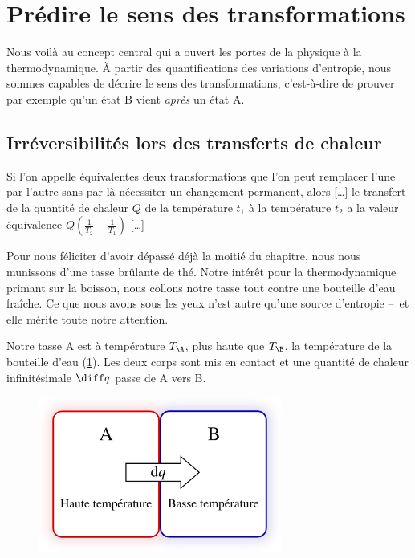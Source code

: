 \section{Prédire le sens des transformations}

	Nous voilà au concept central qui a ouvert les portes de la physique à la thermodynamique. À partir des quantifications des variations d’entropie, nous sommes capables de décrire le sens des transformations, c’est-à-dire de prouver par exemple qu’un état B vient \emph{après} un état A. 

	\subsection{Irréversibilités lors des transferts de chaleur}

			Si l’on appelle équivalentes deux transformations que l’on peut remplacer l’une par l’autre sans par là nécessiter un changement permanent, alors […] le transfert de la quantité de chaleur $Q$ de la température $t_1$ à la température $t_2$ a la valeur équivalence $Q \left( \frac{1}{T_2} - \frac{1}{T_1}\right)$ […]
		
		Pour nous féliciter d’avoir dépassé déjà la moitié du chapitre, nous nous munissons d’une tasse brûlante de thé. Notre intérêt pour la thermodynamique primant sur la boisson, nous collons notre tasse tout contre une bouteille d’eau fraîche. Ce que nous avons sous les yeux n’est autre qu’une source d’entropie --\ et elle mérite toute notre attention.

		Notre tasse A est à température $T_\A$, plus haute que $T_\B$, la température de la bouteille d’eau (\cref{fig_expérience_création_entropie}). Les deux corps sont mis en contact et une quantité de chaleur infinitésimale $\diff q$ passe de A vers B.

		\begin{figure}
			\begin{center}
				\includegraphics[width=8cm]{images/transfert_chaleur_irreversible.png}
			\end{center}
			\label{fig_expérience_création_entropie}
		\end{figure}



